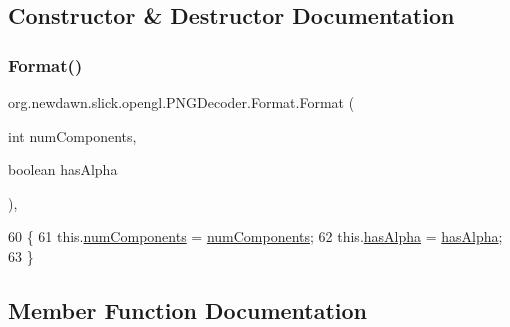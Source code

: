 \subsection{Constructor \& Destructor Documentation}
\mbox{\label{classorg_1_1newdawn_1_1slick_1_1opengl_1_1_p_n_g_decoder_1_1_format_a7ed7ee6686890e5e24465871be7516e3}} 
\subsubsection{\texorpdfstring{Format()}{Format()}}
{\footnotesize\ttfamily org.\+newdawn.\+slick.\+opengl.\+P\+N\+G\+Decoder.\+Format.\+Format (\begin{DoxyParamCaption}\item[{int}]{num\+Components,  }\item[{boolean}]{has\+Alpha }\end{DoxyParamCaption})\hspace{0.3cm}{\ttfamily [inline]}, {\ttfamily [private]}}


\begin{DoxyCode}
60                                                             \{
61             this.\mbox{\hyperlink{classorg_1_1newdawn_1_1slick_1_1opengl_1_1_p_n_g_decoder_1_1_format_a5341873553cbc62b97c74e2bddea56d3}{numComponents}} = \mbox{\hyperlink{classorg_1_1newdawn_1_1slick_1_1opengl_1_1_p_n_g_decoder_1_1_format_a5341873553cbc62b97c74e2bddea56d3}{numComponents}};
62             this.\mbox{\hyperlink{classorg_1_1newdawn_1_1slick_1_1opengl_1_1_p_n_g_decoder_1_1_format_a63e22f1217dc807077929d895fea4182}{hasAlpha}} = \mbox{\hyperlink{classorg_1_1newdawn_1_1slick_1_1opengl_1_1_p_n_g_decoder_1_1_format_a63e22f1217dc807077929d895fea4182}{hasAlpha}};
63         \}
\end{DoxyCode}


\subsection{Member Function Documentation}
\mbox{\label{classorg_1_1newdawn_1_1slick_1_1opengl_1_1_p_n_g_decoder_1_1_format_a9a6a9832fa794ee57921dddb4220e8b5}} 
